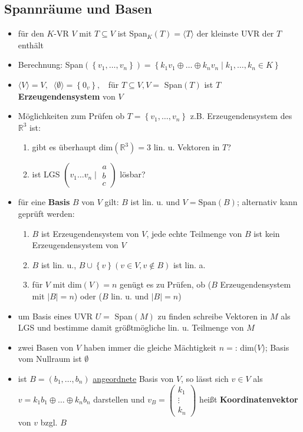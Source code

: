 \documentclass[10pt,a4paper]{article}
\begin{document}
\subsection{Spannräume und Basen}
\begin{itemize}
\item für den $K$-VR $V$ mit $T\subseteq V$ ist Span$_{K}(T)=\langle T \rangle$ der kleinste UVR der $T$ enthält \item Berechnung: Span$(\left\lbrace v_{1},\dotsc ,v_{n}\right\rbrace)=\left\lbrace k_{1}v_{1}\oplus \dotsc \oplus k_{n}v_{n}\mid k_{1},\dotsc ,k_{n} \in K\right\rbrace $
\item $\langle V\rangle =V, \;\; \langle \emptyset \rangle =\left\lbrace 0_{v} \right\rbrace,\;\;$ für $T\subseteq V,V=$ Span$(T)$ ist $T$ \textbf{Erzeugendensystem} von $V$
\item Möglichkeiten zum Prüfen ob $T=\left\lbrace  v_{1}, \dotsc, v_{n} \right\rbrace$ z.B. Erzeugendensystem des $\mathbb{R}^{3}$ ist: 
\begin{enumerate}
\item gibt es überhaupt dim$(\mathbb{R}^3)=3$ lin. u. Vektoren in $T$?
\item ist LGS $\left(v_{1} \dotsc v_{n} \mid \begin{matrix} a\\  b\\c\end{matrix}\right)$ lösbar? 
\end{enumerate}
\item für eine \textbf{Basis} $B$ von $V$ gilt: $B$ ist lin. u. und $V=\text{Span}(B)$; alternativ kann geprüft werden: \begin{enumerate}
\item $B$ ist Erzeugendensystem von $V$, jede echte Teilmenge von $B$ ist kein Erzeugendensystem von $V$
\item $B$ ist lin. u., $B\cup \left\lbrace v \right\rbrace (v \in V,v\not\in B)$ ist lin. a. 
\item für $V$ mit dim$(V)=n$ genügt es zu Prüfen, ob ($B$ Erzeugendensystem mit $\vert B\vert=n$) oder ($B$ lin. u. und $\vert B\vert=n$)
\end{enumerate}
\item um Basis eines UVR $U=$ Span$(M)$ zu finden schreibe Vektoren in $M$ als LGS und bestimme damit größtmögliche lin. u. Teilmenge von $M$ 
\item zwei Basen von $V$ haben immer die gleiche Mächtigkeit $n=:\, $dim($V$); Basis vom Nullraum ist $\emptyset$
\item ist $B=(b_{1},\dotsc,b_{n})$ \underline{angeordnete} Basis von $V$, so lässt sich $v\in V$ als $v=k_{1}b_{1}\oplus\dotsc  \oplus k_{n}b_{n}$ darstellen und $v_{B}=\begin{pmatrix} k_{1}\\ \vdots\\ k_{n} \end{pmatrix}$ heißt \textbf{Koordinatenvektor} von $v$ bzgl. $B$ 
\end{itemize}
\end{document}
